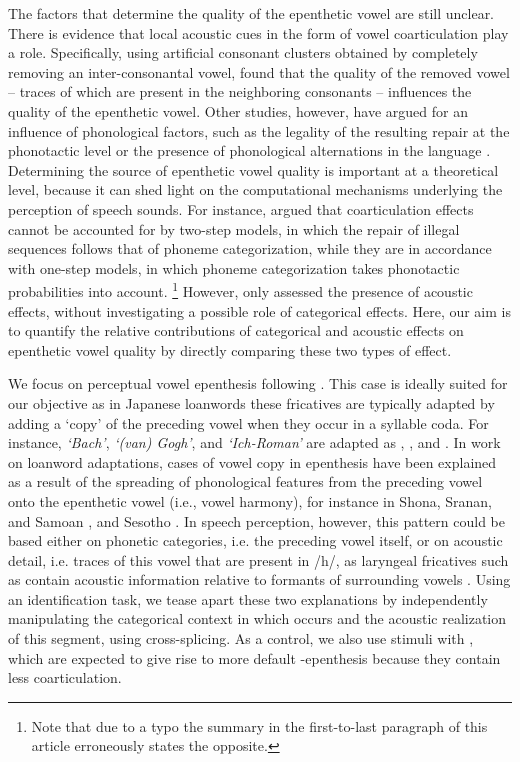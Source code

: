 The factors that determine the quality of the epenthetic vowel are still unclear. There is evidence that local acoustic cues in the form of vowel coarticulation play a role. Specifically, using artificial consonant clusters obtained by completely removing an inter-consonantal vowel, \cite{dupoux2011} found that the quality of the removed vowel -- traces of which are present in the neighboring consonants -- influences the quality of the epenthetic vowel. Other studies, however, have argued for an influence of phonological factors, such as the legality of the resulting repair at the phonotactic level \cite{mattingley2015} or the presence of phonological alternations in the language \cite{durvasula2015}. Determining the source of epenthetic vowel quality is important at a theoretical level, because it can shed light on the computational mechanisms underlying the perception of speech sounds. For instance, \cite{dupoux2011} argued that coarticulation effects cannot be accounted for by two-step models, in which the repair of illegal sequences follows that of phoneme categorization, while they are in accordance with one-step models, in which phoneme categorization takes phonotactic probabilities into account.
\footnote{Note that due to a typo the summary in the first-to-last paragraph of this article erroneously states the opposite.} 
However, \cite{dupoux2011} only assessed the presence of acoustic effects, without investigating a possible role of categorical effects. Here, our aim is to quantify the relative contributions of categorical and acoustic effects on epenthetic vowel quality by directly comparing these two types of effect. 

We focus on perceptual vowel epenthesis following . This case is ideally suited for our objective as in Japanese loanwords these fricatives are typically adapted by adding a `copy' of the preceding vowel when they occur in a syllable coda. For instance, \textit{`Bach'}, \textit{`(van) Gogh'}, and \textit{`Ich-Roman'} are adapted as , , and . In work on loanword adaptations, cases of vowel copy in epenthesis have been explained as a result of the spreading of phonological features from the preceding vowel onto the epenthetic vowel (i.e., vowel harmony), for instance in Shona, Sranan, and Samoan \cite{uffmann2006}, and Sesotho \cite{rose2006}. In speech perception, however, this pattern could be based either on phonetic categories, i.e. the preceding vowel itself, or on acoustic detail, i.e. traces of this vowel that are present in /h/, as laryngeal fricatives such as  contain acoustic information relative to formants of surrounding vowels \cite{keating1988}. Using an identification task, we tease apart these two explanations by independently manipulating the categorical context in which  occurs and the acoustic realization of this segment, using cross-splicing. As a control, we also use stimuli with , which are expected to give rise to more default -epenthesis because they contain less coarticulation. 

